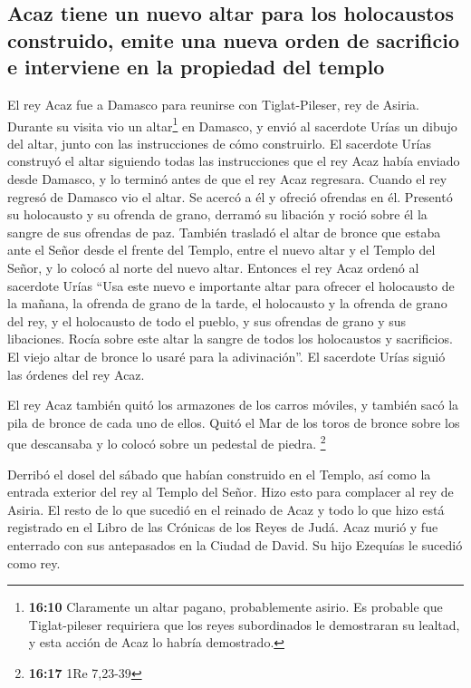 \hypertarget{acaz-tiene-un-nuevo-altar-para-los-holocaustos-construido-emite-una-nueva-orden-de-sacrificio-e-interviene-en-la-propiedad-del-templo}{%
\subsection{Acaz tiene un nuevo altar para los holocaustos construido,
emite una nueva orden de sacrificio e interviene en la propiedad del
templo}\label{acaz-tiene-un-nuevo-altar-para-los-holocaustos-construido-emite-una-nueva-orden-de-sacrificio-e-interviene-en-la-propiedad-del-templo}}

 El rey Acaz fue a Damasco para reunirse con
Tiglat-Pileser, rey de Asiria. Durante su visita vio un altar\footnote{\textbf{16:10}
  Claramente un altar pagano, probablemente asirio. Es probable que
  Tiglat-pileser requiriera que los reyes subordinados le demostraran su
  lealtad, y esta acción de Acaz lo habría demostrado.} en Damasco, y
envió al sacerdote Urías un dibujo del altar, junto con las
instrucciones de cómo construirlo.  El sacerdote Urías
construyó el altar siguiendo todas las instrucciones que el rey Acaz
había enviado desde Damasco, y lo terminó antes de que el rey Acaz
regresara.  Cuando el rey regresó de Damasco vio el
altar. Se acercó a él y ofreció ofrendas en él.  Presentó
su holocausto y su ofrenda de grano, derramó su libación y roció sobre
él la sangre de sus ofrendas de paz.  También trasladó el
altar de bronce que estaba ante el Señor desde el frente del Templo,
entre el nuevo altar y el Templo del Señor, y lo colocó al norte del
nuevo altar.  Entonces el rey Acaz ordenó al sacerdote
Urías ``Usa este nuevo e importante altar para ofrecer el holocausto de
la mañana, la ofrenda de grano de la tarde, el holocausto y la ofrenda
de grano del rey, y el holocausto de todo el pueblo, y sus ofrendas de
grano y sus libaciones. Rocía sobre este altar la sangre de todos los
holocaustos y sacrificios. El viejo altar de bronce lo usaré para la
adivinación''.  El sacerdote Urías siguió las órdenes del
rey Acaz.

 El rey Acaz también quitó los armazones de los carros
móviles, y también sacó la pila de bronce de cada uno de ellos. Quitó el
Mar de los toros de bronce sobre los que descansaba y lo colocó sobre un
pedestal de piedra. \footnote{\textbf{16:17} 1Re 7,23-39}

 Derribó el dosel del sábado que habían construido en el
Templo, así como la entrada exterior del rey al Templo del Señor. Hizo
esto para complacer al rey de Asiria.  El resto de lo que
sucedió en el reinado de Acaz y todo lo que hizo está registrado en el
Libro de las Crónicas de los Reyes de Judá.  Acaz murió y
fue enterrado con sus antepasados en la Ciudad de David. Su hijo
Ezequías le sucedió como rey.

